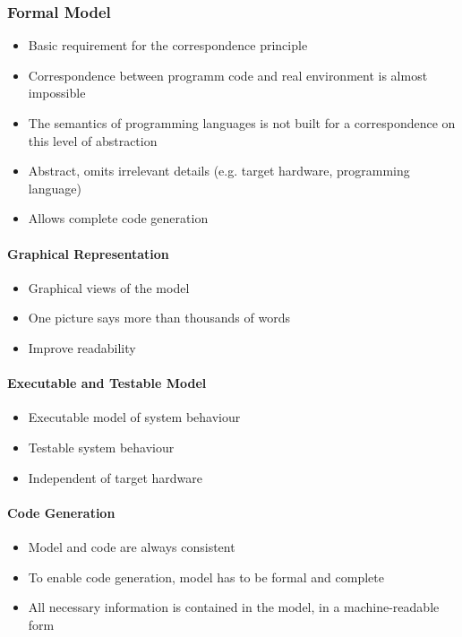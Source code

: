 \subsubsection{Formal Model}
\begin{itemize}
    \item Basic requirement for the correspondence principle
    \item Correspondence between programm code and real environment is almost impossible
    \item The semantics of programming languages is not built for a correspondence on this level of abstraction
    \item Abstract, omits irrelevant details (e.g. target hardware, programming language)
    \item Allows complete code generation
\end{itemize}

\paragraph{Graphical Representation}
\begin{itemize}
    \item Graphical views of the model
    \item \glqq One picture says more than thousands of words\grqq
    \item Improve readability
\end{itemize}

\paragraph{Executable and Testable Model}
\begin{itemize}
    \item Executable model of system behaviour
    \item Testable system behaviour
    \item Independent of target hardware
\end{itemize}

\paragraph{Code Generation}
\begin{itemize}
    \item Model and code are always consistent
    \item To enable code generation, model has to be formal and complete
    \item All necessary information is contained in the model, in a machine-readable form
\end{itemize}


